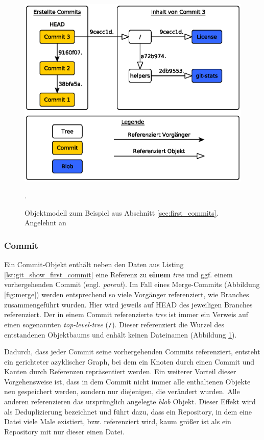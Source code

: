 
\begin{figure}[h]
  \centering
  \includegraphics[scale=0.75]{images/objectmodel.eps}
  \caption{Objektmodell zum Beispiel aus Abschnitt \ref{sec:first_commits}.
  Angelehnt an \cite[S.~53]{gitosp}}.
  \label{fig:objectmodel}
\end{figure}

\subsubsection{Commit}\label{sec:commitobject}
Ein Commit-Objekt enthält neben den Daten aus Listing
\ref{lst:git_show_first_commit} eine Referenz zu \textbf{einem} \textit{tree}
und ggf. einem vorhergehenden Commit (engl. \textit{parent}). Im Fall eines
Merge-Commits (Abbildung \ref{fig:merge}) werden entsprechend so viele
Vorgänger referenziert, wie Branches zusammengeführt wurden. Hier wird jeweils
auf \gls{HEAD} des jeweiligen Branches referenziert. Der in einem Commit
referenzierte \textit{tree} ist immer ein Verweis auf einen sogenannten
\textit{top-level-tree} (\texttt{/}). Dieser referenziert die Wurzel des
entstandenen Objektbaums und enhält keinen Dateinamen (Abbildung
\ref{fig:objectmodel}).

Dadurch, dass jeder Commit seine vorhergehenden Commits referenziert, entsteht ein
gerichteter azyklischer Graph, bei dem ein Knoten durch einen Commit und Kanten
durch Referenzen repräsentiert werden. Ein weiterer Vorteil dieser
Vorgehensweise ist, dass in dem Commit nicht immer alle enthaltenen Objekte neu
gespeichert werden, sondern nur diejenigen, die verändert wurden. Alle anderen
referenzieren das ursprünglich angelegte \textit{blob} Objekt. Dieser Effekt
wird als Deduplizierung bezeichnet und führt dazu, dass ein Repository, in dem
eine Datei viele Male existiert, bzw. referenziert wird, kaum größer ist als ein
Repository mit nur dieser einen Datei. \cite[56-57]{gitosp}


